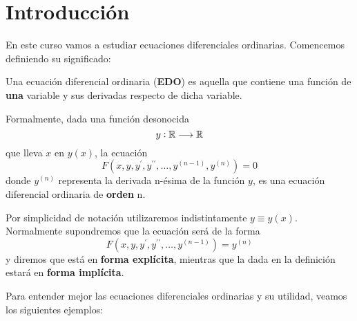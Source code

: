 \section{Introducción}

En este curso vamos a estudiar ecuaciones diferenciales ordinarias. Comencemos definiendo su significado:

\begin{definition}
Una ecuación diferencial ordinaria (\textbf{EDO}) es aquella que contiene una función de \textbf{una} variable y sus derivadas respecto de dicha variable.

Formalmente, dada una función desonocida $$y: \mathbb{R} \longrightarrow \mathbb{R}$$ que lleva $x$ en $y(x)$, la ecuación $$F(x, y, y^\prime, y^{\prime\prime},\hdots, y^{(n-1)}, y^{(n)}) = 0$$ donde $y^{(n)}$ representa la derivada n-ésima de la función $y$, es una ecuación diferencial ordinaria de \textbf{orden} n.
\end{definition}

Por simplicidad de notación utilizaremos indistintamente $y \equiv y(x)$.
Normalmente supondremos que la ecuación será de la forma $$F(x, y, y^\prime,y^{\prime\prime},\hdots, y^{(n-1)}) =  y^{(n)}$$
y diremos que está en \textbf{forma explícita}, mientras que la dada en la definición estará en \textbf{forma implícita}.

Para entender mejor las ecuaciones diferenciales ordinarias y su utilidad, veamos los siguientes ejemplos:


